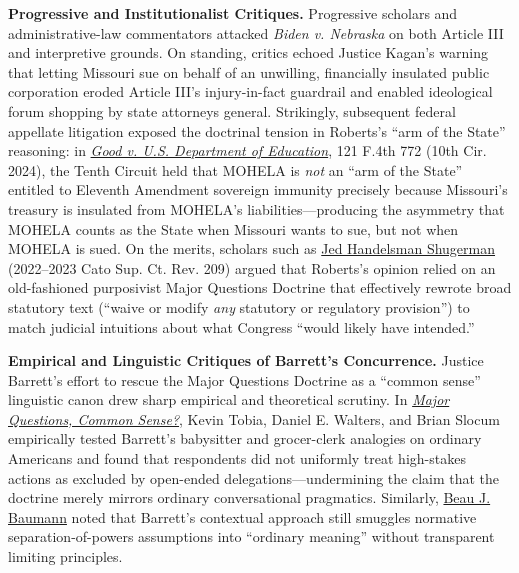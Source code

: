 \documentclass[12pt]{article}
\begin{document}
\textbf{Progressive and Institutionalist Critiques.} Progressive scholars and administrative-law commentators attacked \textit{Biden v. Nebraska} on both Article III and interpretive grounds. On standing, critics echoed Justice Kagan's warning that letting Missouri sue on behalf of an unwilling, financially insulated public corporation eroded Article III's injury-in-fact guardrail and enabled ideological forum shopping by state attorneys general. Strikingly, subsequent federal appellate litigation exposed the doctrinal tension in Roberts's ``arm of the State'' reasoning: in \href{https://law.justia.com/cases/federal/appellate-courts/ca10/22-3286/22-3286-2024-11-12.html}{\textit{Good v. U.S. Department of Education}}, 121 F.4th 772 (10th Cir. 2024), the Tenth Circuit held that MOHELA is \textit{not} an ``arm of the State'' entitled to Eleventh Amendment sovereign immunity precisely because Missouri's treasury is insulated from MOHELA's liabilities---producing the asymmetry that MOHELA counts as the State when Missouri wants to sue, but not when MOHELA is sued. On the merits, scholars such as \href{https://www.cato.org/sites/cato.org/files/2023-09/cato-supreme-court-review-9.pdf}{Jed Handelsman Shugerman} (2022--2023 Cato Sup. Ct. Rev. 209) argued that Roberts's opinion relied on an old-fashioned purposivist Major Questions Doctrine that effectively rewrote broad statutory text (``waive or modify \textit{any} statutory or regulatory provision'') to match judicial intuitions about what Congress ``would likely have intended.''

\textbf{Empirical and Linguistic Critiques of Barrett's Concurrence.} Justice Barrett's effort to rescue the Major Questions Doctrine as a ``common sense'' linguistic canon drew sharp empirical and theoretical scrutiny. In \href{https://www.law.nyu.edu/sites/default/files/tobia_walters_slocum_major\%20questions.pdf}{\textit{Major Questions, Common Sense?}}, Kevin Tobia, Daniel E. Walters, and Brian Slocum empirically tested Barrett's babysitter and grocer-clerk analogies on ordinary Americans and found that respondents did not uniformly treat high-stakes actions as excluded by open-ended delegations---undermining the claim that the doctrine merely mirrors ordinary conversational pragmatics. Similarly, \href{https://www.yalejreg.com/nc/lets-talk-about-that-barrett-concurrence-on-the-contextual-major-questions-doctrine-by-beau-j-baumann/}{Beau J. Baumann} noted that Barrett's contextual approach still smuggles normative separation-of-powers assumptions into ``ordinary meaning'' without transparent limiting principles.
\end{document}

